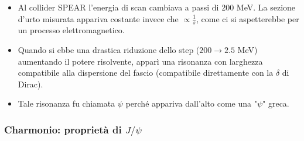 \begin{itemize}
\item Al collider SPEAR l'energia di scan cambiava a passi di 200 MeV. La sezione d'urto misurata appariva costante invece che $\propto\frac1s$, come ci si aspetterebbe per un processo elettromagnetico.
\item Quando si ebbe una drastica riduzione dello step ($200\to2.5$ MeV) aumentando il potere risolvente, apparì una risonanza con larghezza compatibile alla dispersione del fascio (compatibile direttamente con la $\delta$ di Dirac).
\item Tale risonanza fu chiamata $\psi$ perché appariva dall'alto come una "$\psi$" greca.
\end{itemize}
\subsubsection{Charmonio: proprietà di $J/\psi$}
